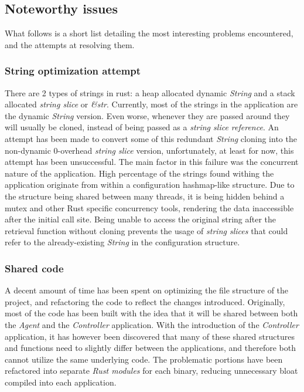     
    \subsection{Noteworthy issues}\label{sec:notable-issues}
        What follows is a short list detailing the most interesting problems encountered, and the attempts at resolving them.
    
        \subsubsection{String optimization attempt}
             There are 2 types of strings in rust: a heap allocated dynamic \textit{String} and a stack allocated \textit{string slice} or \textit{\&str}. Currently, most of the strings in the application are the dynamic \textit{String} version. Even worse, whenever they are passed around they will usually be cloned, instead of being passed as a \textit{string slice reference}. An attempt has been made to convert some of this redundant \textit{String} cloning into the non-dynamic 0-overhead \textit{string slice} version, unfortunately, at least for now, this attempt has been unsuccessful. The main factor in this failure was the concurrent nature of the application. High percentage of the strings found withing the application originate from within a configuration hashmap-like structure. Due to the structure being shared between many threads, it is being hidden behind a mutex and other Rust specific concurrency tools, rendering the data inaccessible after the initial call site. Being unable to access the original string after the retrieval function without cloning prevents the usage of \textit{string slices} that could refer to the already-existing \textit{String} in the configuration structure.
        
        \subsubsection{Shared code}\label{sec:shared-code}
            A decent amount of time has been spent on optimizing the file structure of the project, and refactoring the code to reflect the changes introduced. Originally, most of the code has been built with the idea that it will be shared between both the \textit{Agent} and the \textit{Controller} application. With the introduction of the \textit{Controller} application, it has however been discovered that many of these shared structures and functions need to slightly differ between the applications, and therefore both cannot utilize the same underlying code. The problematic portions have been refactored into separate \textit{Rust modules} for each binary, reducing unnecessary bloat compiled into each application.
             
